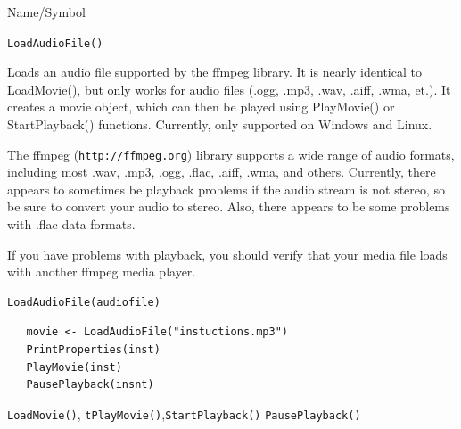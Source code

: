 \begin{desc}{Name/Symbol}
\item[Name/Symbol]	\verb+LoadAudioFile()+
 
\item[Description] Loads an audio file supported by  the ffmpeg library.  It is nearly identical to
LoadMovie(), but only works for audio files (.ogg, .mp3, .wav, .aiff, .wma, et.).  It creates a movie
object, which can then be played using PlayMovie() or StartPlayback() functions.  Currently,
only supported on Windows and Linux.

The ffmpeg (\verb+http://ffmpeg.org+) library supports a wide range of audio formats,
including most .wav, .mp3, .ogg, .flac, .aiff, .wma, and others.   Currently, there appears to sometimes
be playback problems if the audio stream is not stereo, so be sure to convert your audio to stereo.
Also, there appears to be some problems with .flac data formats.

If you have problems with playback, 
you should verify that your media file loads with another ffmpeg media player.

\item[Usage]		
\begin{verbatim}
LoadAudioFile(audiofile)
\end{verbatim}

\item[Example]	
\begin{verbatim}
   movie <- LoadAudioFile("instuctions.mp3")
   PrintProperties(inst)
   PlayMovie(inst)
   PausePlayback(insnt)
\end{verbatim}

\item[See Also]  \verb+LoadMovie()+, \verb+tPlayMovie()+,\verb+StartPlayback()+ \verb+PausePlayback()+
\end{desc}


